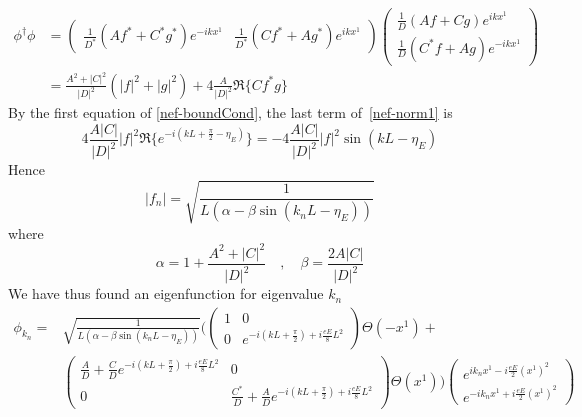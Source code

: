 \begin{equation}\label{nef-norm1}
\begin{split}
\phi^\dagger \phi & = \begin{pmatrix}
\frac{1}{D^*}(Af^* +  C^*g^*)e^{-ikx^1}  & \frac{1}{D^*}(C f^* + Ag^*)e^{ikx^1} 
\end{pmatrix}\begin{pmatrix}
\frac{1}{D}(Af +  Cg)e^{ikx^1}  \\
 \frac{1}{D}(C^* f + Ag)e^{-ikx^1} 
\end{pmatrix}  \\
 & =
\frac{A^2 + | C|^2}{| D |^2}(|f|^2 + |g|^2) + 4\frac{A}{|D|^2}\Re \{C f^* g\}
\end{split}
\end{equation}
By the first equation of \cref{nef-boundCond}, the last term of~\cref{nef-norm1} is 
\begin{equation*}
4\frac{A |C|}{|D|^2}| f|^2\Re\{e ^{-i(kL + \frac{\pi}{2} - \eta_E)}\} = 
- 4\frac{A |C|}{|D|^2}| f|^2\sin( kL - \eta_E) 
\end{equation*}
Hence
\begin{equation*}
 | f_{n} | =  \sqrt{\frac{1}{L(\alpha - \beta \sin (k_{n} L - \eta_E))}}  
\end{equation*}
where 
\begin{equation*}
\alpha = 1+\frac{A^2 + |C|^2}{|D|^2} \quad,\quad
\beta = \frac{2 A |C|}{|D|^2}
\end{equation*}
We have thus found an eigenfunction for eigenvalue $k_n$
\begin{equation*} 
\begin{split}
\phi_{k_{n}} = 
& \sqrt{\frac{1}{L(\alpha - \beta \sin (k_{n}L - \eta_E))}} \Bigg( 
\begin{pmatrix}
1 & 0 \\
0  & e^{-i(kL + \frac{\pi}{2}) + i\frac{eE}{8}L^2}
\end{pmatrix}
\Theta(-x^1) + \\
& \begin{pmatrix}
\frac{A}{D}  +  \frac{C}{D} e^{-i(kL + \frac{\pi}{2})+ i\frac{eE}{8}L^2} & 0 \\
0  & \frac{C^*}{D}  + \frac{A}{D}e^{-i(kL + \frac{\pi}{2} ) + i\frac{eE}{8}L^2}
\end{pmatrix}\Theta(x^1)\Bigg)
\begin{pmatrix}
e^{ik_{n} x^1 -  i\frac{eE}{2}(x^1)^2} \\
e^{- ik_{n} x^1 + i\frac{eE}{2}(x^1)^2}
\end{pmatrix}
\end{split}
\end{equation*}
